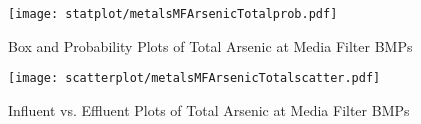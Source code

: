         \begin{figure}[hb]   %
            \centering
            \texttt{[image: statplot/metalsMFArsenicTotalprob.pdf]}
            \caption{Box and Probability Plots of Total Arsenic at Media Filter BMPs}
        \end{figure}         %
        
        
        \begin{figure}[hb]   %
            \centering
            \texttt{[image: scatterplot/metalsMFArsenicTotalscatter.pdf]}
            \caption{Influent vs. Effluent Plots of Total Arsenic at Media Filter BMPs}
        \end{figure}         %
        \clearpage
        